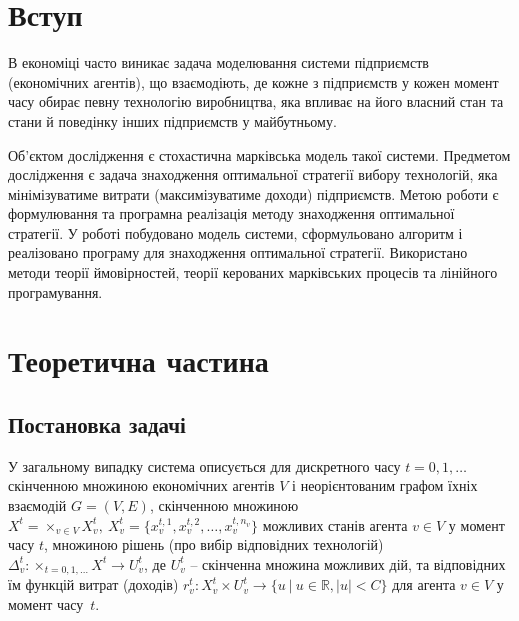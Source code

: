 \documentclass[oneside,14pt]{extarticle}
\begin{document}

\setcounter{page}{2}

\tableofcontents
\clearpage

\section{Вступ}

В економіці часто виникає\cite{David:1998} задача моделювання системи підприємств (економічних агентів), що взаємодіють, де кожне з підприємств у кожен момент часу обирає певну технологію виробництва, яка впливає на його власний стан та стани й поведінку інших підприємств у майбутньому.

Об’єктом дослідження є стохастична марківська модель такої системи. Предметом дослідження є задача знаходження оптимальної стратегії вибору технологій, яка мінімізуватиме витрати (максимізуватиме доходи) підприємств. Метою роботи є формулювання та програмна реалізація методу знаходження оптимальної стратегії. У роботі побудовано модель системи, сформульовано алгоритм і реалізовано програму для знаходження оптимальної стратегії. Використано методи теорії ймовірностей, теорії керованих марківських процесів та лінійного програмування. 

\vspace{2em}

\section{Теоретична частина}

\subsection{Постановка задачі}

\label{sec:description}

У загальному випадку система описується\cite{Chornei:2005} для дискретного часу \(t = 0, 1, \ldots \) скінченною множиною економічних агентів \(V\) і неорієнтованим графом їхніх взаємодій \(G = (V, E)\), скінченною множиною \(X^t = \times_{v \in V}X_v^t,\ X_v^t = \{x^{t,1}_v, x^{t,2}_v, \ldots, x^{t,n_v}_v\}\) можливих станів агента \(v \in V\) у момент часу \(t\), множиною рішень (про вибір відповідних технологій) \(\Delta_v^t: \times_{t=0,1,\ldots}X^t \rightarrow U_v^t\), де \(U_v^t\) – скінченна множина можливих дій, та відповідних їм функцій витрат (доходів) \(r_v^t: X_v^t \times U_v^t \rightarrow \{u\ |\ u \in \mathbb{R}, |u| < C\}\) для агента \(v \in V\) у момент часу~\(t\).
\end{document}
